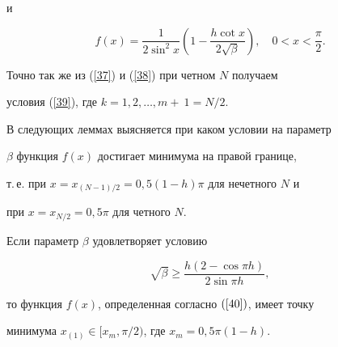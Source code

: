 и


\begin{equation}\label{40}


f(x)=\frac{1} {{2\sin ^2 x}}\left({1-\frac{{h\cot x}}


{{2\sqrt \beta}}} \right),\quad 0<x<\frac{\pi}{2}.


\end{equation}


Точно так же из (\ref{37}) и (\ref{38}) при четном $N$ получаем


условия (\ref{39}), где $k=1,2,\dotsc,m+~ 1=N/2$.





В следующих леммах выясняется при каком условии на параметр


$\beta $ функция $f(x)$ достигает минимума на правой границе, 


т.\,е. при $x=x_{(N-1)/2}=0{,}5(1-h)\pi $ для нечетного $N$ и


при $x=x_{N/2}=0{,}5\pi $ для четного $N$.





\begin{lem}\label{lemma1}


Если параметр $\beta $ удовлетворяет условию


\begin{equation}\label{41}


\sqrt \beta \geqslant \frac{{h(2-\cos \pi h)}} {{2\sin \pi h}},


\end{equation}


то функция $f(x)$, определенная согласно $(\ref{40})$, имеет точку


минимума $x_{(1)} \in [ {x_m,\pi /2})$, где $x_m=0{,}5\pi (1-h)$.


\end{lem}





